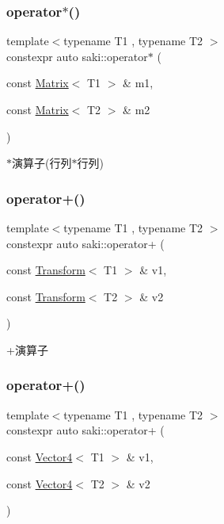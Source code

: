 \subsubsection{\texorpdfstring{operator$\ast$()}{operator*()}\hspace{0.1cm}{\footnotesize\ttfamily [14/14]}}
{\footnotesize\ttfamily template$<$typename T1 , typename T2 $>$ \\
constexpr auto saki\+::operator$\ast$ (\begin{DoxyParamCaption}\item[{const \mbox{\hyperlink{classsaki_1_1_matrix}{Matrix}}$<$ T1 $>$ \&}]{m1,  }\item[{const \mbox{\hyperlink{classsaki_1_1_matrix}{Matrix}}$<$ T2 $>$ \&}]{m2 }\end{DoxyParamCaption})}



$\ast$演算子(行列$\ast$行列) 

\mbox{\label{namespacesaki_a5fad053b349698ccff4e555316544e68}} 
\subsubsection{\texorpdfstring{operator+()}{operator+()}\hspace{0.1cm}{\footnotesize\ttfamily [1/5]}}
{\footnotesize\ttfamily template$<$typename T1 , typename T2 $>$ \\
constexpr auto saki\+::operator+ (\begin{DoxyParamCaption}\item[{const \mbox{\hyperlink{classsaki_1_1_transform}{Transform}}$<$ T1 $>$ \&}]{v1,  }\item[{const \mbox{\hyperlink{classsaki_1_1_transform}{Transform}}$<$ T2 $>$ \&}]{v2 }\end{DoxyParamCaption})}



+演算子 

\mbox{\label{namespacesaki_a30ce7f379800f5d94b03c358574ba7b5}} 
\subsubsection{\texorpdfstring{operator+()}{operator+()}\hspace{0.1cm}{\footnotesize\ttfamily [2/5]}}
{\footnotesize\ttfamily template$<$typename T1 , typename T2 $>$ \\
constexpr auto saki\+::operator+ (\begin{DoxyParamCaption}\item[{const \mbox{\hyperlink{classsaki_1_1_vector4}{Vector4}}$<$ T1 $>$ \&}]{v1,  }\item[{const \mbox{\hyperlink{classsaki_1_1_vector4}{Vector4}}$<$ T2 $>$ \&}]{v2 }\end{DoxyParamCaption})}




